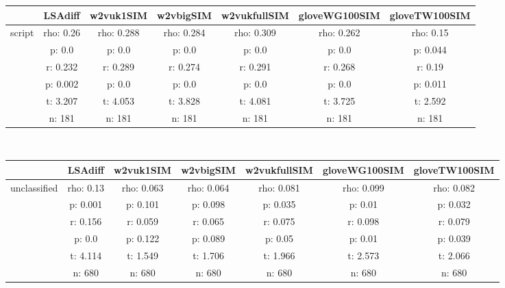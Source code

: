 \documentclass{article}
\begin{document}
\begin{tabular}{ccccccc|}\cline{2-7}
&\multicolumn{1}{|c}{LSAdiff} & w2vuk1SIM & w2vbigSIM & w2vukfullSIM & gloveWG100SIM & gloveTW100SIM \\\hline
\multicolumn{1}{|c|}{\multirow{6}{*}{script}} & rho: 0.26 & rho: 0.288 & rho: 0.284 & rho: 0.309 & rho: 0.262 & rho: 0.15 \\
\multicolumn{1}{|c|}{} & p: 0.0 & p: 0.0 & p: 0.0 & p: 0.0 & p: 0.0 & p: 0.044 \\
\multicolumn{1}{|c|}{} & r: 0.232 & r: 0.289 & r: 0.274 & r: 0.291 & r: 0.268 & r: 0.19 \\
\multicolumn{1}{|c|}{} & p: 0.002 & p: 0.0 & p: 0.0 & p: 0.0 & p: 0.0 & p: 0.011 \\
\multicolumn{1}{|c|}{} & t: 3.207 & t: 4.053 & t: 3.828 & t: 4.081 & t: 3.725 & t: 2.592 \\
\multicolumn{1}{|c|}{} & n: 181 & n: 181 & n: 181 & n: 181 & n: 181 & n: 181 \\
\hline
\end{tabular}\\
\begin{tabular}{ccccccc|}\cline{2-7}
&\multicolumn{1}{|c}{LSAdiff} & w2vuk1SIM & w2vbigSIM & w2vukfullSIM & gloveWG100SIM & gloveTW100SIM \\\hline
\multicolumn{1}{|c|}{\multirow{6}{*}{unclassified}} & rho: 0.13 & rho: 0.063 & rho: 0.064 & rho: 0.081 & rho: 0.099 & rho: 0.082 \\
\multicolumn{1}{|c|}{} & p: 0.001 & p: 0.101 & p: 0.098 & p: 0.035 & p: 0.01 & p: 0.032 \\
\multicolumn{1}{|c|}{} & r: 0.156 & r: 0.059 & r: 0.065 & r: 0.075 & r: 0.098 & r: 0.079 \\
\multicolumn{1}{|c|}{} & p: 0.0 & p: 0.122 & p: 0.089 & p: 0.05 & p: 0.01 & p: 0.039 \\
\multicolumn{1}{|c|}{} & t: 4.114 & t: 1.549 & t: 1.706 & t: 1.966 & t: 2.573 & t: 2.066 \\
\multicolumn{1}{|c|}{} & n: 680 & n: 680 & n: 680 & n: 680 & n: 680 & n: 680 \\
\hline
\end{tabular}\\
\end{document}
